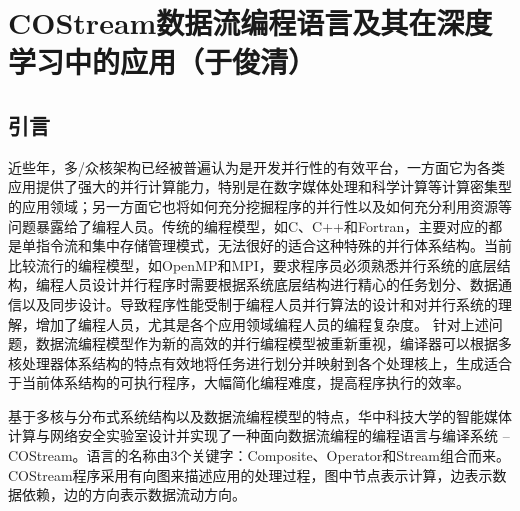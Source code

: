 \makeatletter
\newenvironment{breakablealgorithm}
  {%
  \begin{flushleft}
    \refstepcounter{algorithm}%
    \hrule height.8pt depth0pt \kern2pt%
    \renewcommand{\caption}[2][\relax]{%
      {\raggedright\textbf{\ALG@name~\thealgorithm} ##2\par}%
      \ifx\relax##1\relax %
        \addcontentsline{loa}{algorithm}{\protect\numberline{\thealgorithm}##2}%
      \else %
        \addcontentsline{loa}{algorithm}{\protect\numberline{\thealgorithm}##1}%
      \fi
      \kern2pt\hrule\kern2pt
    }
  }{%
    \kern2pt\hrule\relax%
  \end{flushleft}
  }
\makeatother

\section{COStream数据流编程语言及其在深度学习中的应用（于俊清）}
\subsection{引言}
近些年，多/众核架构已经被普遍认为是开发并行性的有效平台，一方面它为各类应用提供了强大的并行计算能力，特别是在数字媒体处理和科学计算等计算密集型的应用领域；另一方面它也将如何充分挖掘程序的并行性以及如何充分利用资源等问题暴露给了编程人员。传统的编程模型，如C、C++和Fortran，主要对应的都是单指令流和集中存储管理模式，无法很好的适合这种特殊的并行体系结构。当前比较流行的编程模型，如OpenMP和MPI，要求程序员必须熟悉并行系统的底层结构，编程人员设计并行程序时需要根据系统底层结构进行精心的任务划分、数据通信以及同步设计。导致程序性能受制于编程人员并行算法的设计和对并行系统的理解，增加了编程人员，尤其是各个应用领域编程人员的编程复杂度。
针对上述问题，数据流编程模型作为新的高效的并行编程模型被重新重视，编译器可以根据多核处理器体系结构的特点有效地将任务进行划分并映射到各个处理核上，生成适合于当前体系结构的可执行程序，大幅简化编程难度，提高程序执行的效率。

基于多核与分布式系统结构以及数据流编程模型的特点，华中科技大学的智能媒体计算与网络安全实验室设计并实现了一种面向数据流编程的编程语言与编译系统 -- COStream。语言的名称由3个关键字：Composite、Operator和Stream组合而来。COStream程序采用有向图来描述应用的处理过程，图中节点表示计算，边表示数据依赖，边的方向表示数据流动方向。



